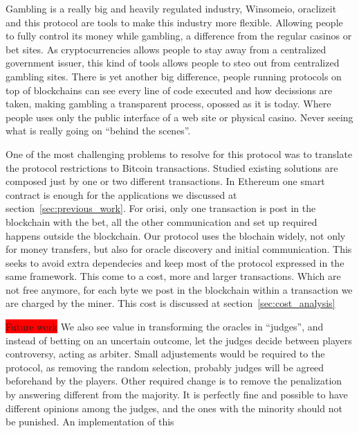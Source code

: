 Gambling is a really big and heavily regulated industry, Winsomeio, oraclizeit
  and this protocol are tools  to make this industry more flexible.
Allowing people to fully control its money while gambling, a difference from
  the regular casinos or bet sites.
As cryptocurrencies allows people to stay away from a centralized government
  issuer, this kind of tools allows people to steo out from centralized gambling
  sites.
There is yet another big difference, people running protocols on top of
  blockchains can see every line of code executed and how decissions are taken,
  making gambling a transparent process, opossed as it is today.
Where people uses only the public interface of a web site or physical casino.
Never seeing what is really going on ``behind the scenes''.

One of the most challenging problems to resolve for this protocol was to
  translate the protocol restrictions to Bitcoin transactions.
Studied existing solutions are composed just by one or two different
  transactions.
In Ethereum one smart contract is enough for the applications we discussed at
  section~\ref{sec:previous_work}.
For orisi, only one transaction is post in the blockchain with the bet, all
  the other communication and set up required happens outside the blockchain.
Our protocol uses the blochain widely, not only for money transfers, but also
  for oracle discovery and initial communication.
This seeks to avoid extra dependecies and keep most of the protocol expressed
  in the same framework.
This come to a cost, more and larger transactions.
Which are not free anymore, for each byte we post in the blockchain within
  a transaction we are charged by the miner.
This cost is discussed at section~\ref{sec:cost_analysis}

\colorbox{red}{Future work}
We also see value in transforming the oracles in ``judges'', and instead of
  betting on an uncertain outcome, let the judges decide between players
  controversy, acting as arbiter.
Small adjustements would be required to the protocol, as removing the random
  selection, probably judges will be agreed beforehand by the players.
Other required change is to remove the penalization by answering different
  from the majority.
It is perfectly fine and possible to have different opinions among the
  judges, and the ones with the minority should not be punished.
An implementation of this

